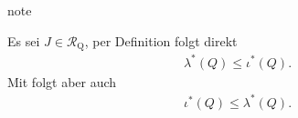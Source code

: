 \documentclass[letterpaper,10pt,german]{jupyterBook}
\begin{document}
\begin{sphinxadmonition}{note}
\sphinxAtStartPar
{}

\sphinxAtStartPar
Es sei \(J\in\mathcal{R}_{\text{Q}}\), per Definition folgt direkt
\begin{equation*}
\begin{split}\lambda^\ast(Q)\leq \iota^\ast(Q).\end{split}
\end{equation*}
\sphinxAtStartPar
Mit {\hyperref[\detokenize{masstheorie/masstheorie:thm:lebesgue}]{}} folgt aber auch
\begin{equation*}
\begin{split}\iota^\ast(Q)\leq \lambda^\ast(Q).\end{split}
\end{equation*}
\sphinxAtStartPar
{}


\end{sphinxadmonition}
\end{document}

